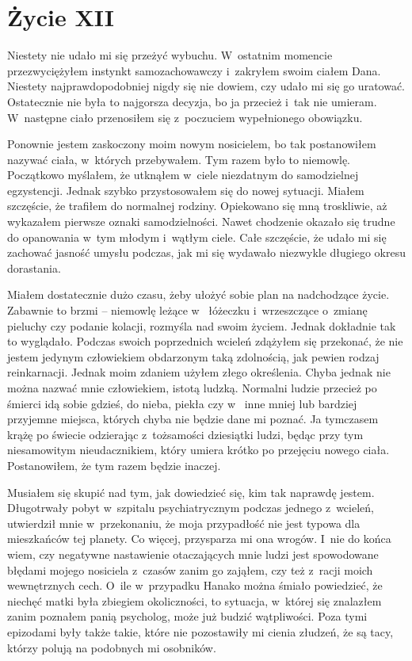 \chapter{Życie XII}

Niestety nie udało mi się przeżyć wybuchu. W~ostatnim momencie przezwyciężyłem instynkt samozachowawczy i~zakryłem 
swoim ciałem Dana. Niestety najprawdopodobniej nigdy się nie dowiem, czy udało mi się go uratować. Ostatecznie nie 
była to najgorsza decyzja, bo ja przecież i~tak nie umieram. W~następne ciało przenosiłem się z~poczuciem 
wypełnionego obowiązku. 

Ponownie jestem zaskoczony moim nowym nosicielem, bo tak postanowiłem nazywać ciała, w~których przebywałem. Tym razem 
było to niemowlę. Początkowo myślałem, że utknąłem w~ciele niezdatnym do samodzielnej egzystencji. Jednak szybko 
przystosowałem się do nowej sytuacji. Miałem szczęście, że trafiłem do normalnej rodziny. Opiekowano się mną 
troskliwie, aż wykazałem pierwsze oznaki samodzielności. Nawet chodzenie okazało się trudne do opanowania w~tym 
młodym i~wątłym ciele. Całe szczęście, że udało mi się zachować jasność umysłu podczas, jak mi się wydawało niezwykle 
długiego okresu dorastania. 

Miałem dostatecznie dużo czasu, żeby ułożyć sobie plan na nadchodzące życie. Zabawnie to brzmi – niemowlę leżące w~
łóżeczku i~wrzeszczące o~zmianę pieluchy czy podanie kolacji, rozmyśla nad swoim życiem. Jednak dokładnie tak to 
wyglądało. Podczas swoich poprzednich wcieleń zdążyłem się przekonać, że nie jestem jedynym człowiekiem obdarzonym 
taką zdolnością, jak pewien rodzaj reinkarnacji. Jednak moim zdaniem użyłem złego określenia. Chyba jednak nie można 
nazwać mnie człowiekiem, istotą ludzką. Normalni ludzie przecież po śmierci idą sobie gdzieś, do nieba, piekła czy w~
inne mniej lub bardziej przyjemne miejsca, których chyba nie będzie dane mi poznać. Ja tymczasem krążę po świecie 
odzierając z~tożsamości dziesiątki ludzi, będąc przy tym niesamowitym nieudacznikiem, który umiera krótko po 
przejęciu nowego ciała. Postanowiłem, że tym razem będzie inaczej. 

Musiałem się skupić nad tym, jak dowiedzieć się, kim tak naprawdę jestem. Długotrwały pobyt w~szpitalu 
psychiatrycznym podczas jednego z~wcieleń, utwierdził mnie w~przekonaniu, że moja przypadłość nie jest typowa dla 
mieszkańców tej planety. Co więcej, przysparza mi ona wrogów. I~nie do końca wiem, czy negatywne nastawienie 
otaczających mnie ludzi jest spowodowane błędami mojego nosiciela z~czasów zanim go zająłem, czy też z~racji moich 
wewnętrznych cech. O~ile w~przypadku Hanako można śmiało powiedzieć, że niechęć matki była zbiegiem okoliczności, to 
sytuacja, w~której się znalazłem zanim poznałem panią psycholog, może już budzić wątpliwości. Poza tymi epizodami 
były także takie, które nie pozostawiły mi cienia złudzeń, że są tacy, którzy polują na podobnych mi osobników. 

